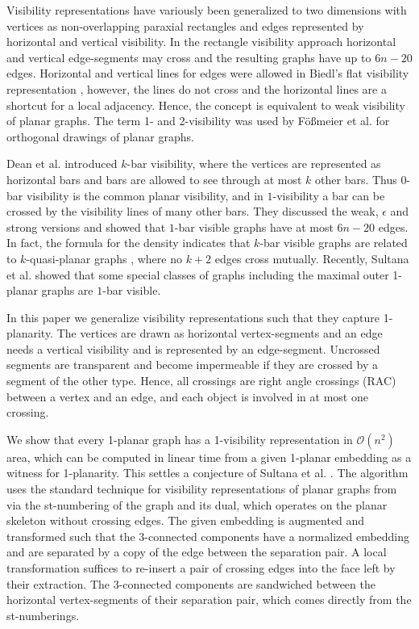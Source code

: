 \documentclass[runningheads]{llncs}
\begin{document}
Visibility representations have variously been generalized to two
dimensions
  with vertices  as non-overlapping paraxial rectangles
  and edges represented by  horizontal and  vertical
visibility. In the rectangle visibility approach
\cite{dh-rvrbg-94,hsv-orstt-95,hsv-rstg-99} horizontal and vertical
  edge-segments may cross and the resulting graphs have up
to $6n-20$ edges. Horizontal and vertical lines for edges were
allowed in   Biedl's flat visibility representation
\cite{b-sdogs-11}, however, the lines do not cross and the
horizontal lines are a shortcut for a local adjacency. Hence, the
concept is equivalent to weak visibility of planar graphs. The term
1- and 2-visibility was used by F\"{o}{\ss}meier et al.
\cite{fkk-2vdpg-96} for orthogonal drawings of planar graphs.

Dean et al. \cite{DEGLST-bkvg-07} introduced $k$-bar visibility,
where the vertices are represented as horizontal bars and bars are
allowed to see through at most  $k$ other bars. Thus $0$-bar
visibility is the common planar visibility, and  in $1$-visibility a
bar can be crossed by the visibility lines of many other bars. They
discussed the weak, $\epsilon$ and strong versions and showed that
$1$-bar visible graphs have at most $6n-20$ edges. In fact, the
formula for the density indicates that $k$-bar visible graphs are
related to $k$-quasi-planar graphs \cite{s-kqpg-12,FPS-nekqpg-13},
where no $k+2$ edges cross mutually. Recently,
 Sultana et al. \cite{srrt-b1vd1-13} showed that some special
 classes of graphs including the maximal outer 1-planar graphs
 are $1$-bar visible.


In this paper we generalize visibility representations such that
 they capture 1-planarity. The vertices are drawn as horizontal
 vertex-segments
 and an edge needs a vertical visibility and is represented by an edge-segment.
 Uncrossed segments
 are transparent and become impermeable if they are crossed by a segment of the other type.
  Hence, all crossings are right angle crossings (RAC) between a vertex
 and an edge, and each object is involved in at most one crossing.



 We show that every 1-planar graph has a 1-visibility
 representation in $\mathcal{O}(n^2)$ area, which can be computed in
 linear time from a given 1-planar embedding as a witness for
 1-planarity. This settles a conjecture of Sultana et al.
 \cite{srrt-b1vd1-13}.
 The algorithm uses the standard technique for visibility
 representations of planar graphs from \cite{dett-gdavg-99,rt-rplbopg-86, TT-vrpg-86}
 via the st-numbering
 of the graph and its dual, which operates on the planar skeleton without crossing edges.
  The given embedding is augmented  and transformed such
 that the 3-connected components have a
 normalized embedding \cite{abk-sld3c-13} and are separated by a
 copy of the edge between the separation pair. A local transformation
suffices to re-insert a pair  of crossing edges into the  face left
by their extraction. The
 3-connected components  are sandwiched between the horizontal
 vertex-segments of their separation pair, which comes directly from the st-numberings.
\end{document}
